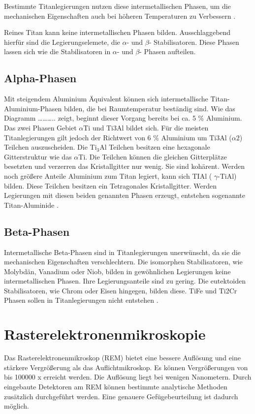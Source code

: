 \documentclass[a4paper, 11pt]{tubsreprt}
\begin{document}
Bestimmte Titanlegierungen nutzen diese intermetallischen Phasen, um die mechanischen Eigenschaften auch bei höheren Temperaturen zu Verbessern \cite{Luetjering2007}.

Reines Titan kann keine intermetallischen Phasen bilden. Ausschlaggebend hierfür sind die Legierungselemete, die $\alpha$- und $\beta$- Stabilisatoren.  Diese Phasen lassen sich wie die Stabilisatoren  in $\alpha$- und $\beta$- Phasen aufteilen.  
\subsection{Alpha-Phasen}
Mit steigendem Aluminium Äquivalent können sich intermetallische Titan-Aluminium-Phasen bilden, die bei Raumtemperatur beständig sind. Wie das Diagramm ……….. zeigt, beginnt dieser Vorgang bereits bei ca. 5 \% Aluminium. Das zwei Phasen Gebiet $\alpha$Ti und Ti3Al bildet sich. Für die meisten Titanlegierungen gilt jedoch der Richtwert von 6 \% Aluminium um Ti3Al ($\alpha2$) Teilchen auszuscheiden.  Die Ti$_{3}$Al Teilchen besitzen eine hexagonale Gitterstruktur wie das $\alpha$Ti. Die Teilchen können  die gleichen Gitterplätze besetzten und verzerren das Kristallgitter nur wenig. Sie sind kohärent.
Werden noch größere Anteile Aluminium  zum Titan legiert, kann sich TIAl ( $\gamma$-TiAl) bilden. Diese Teilchen besitzen ein Tetragonales Kristallgitter.
 Werden Legierungen mit diesen beiden genannten Phasen erzeugt, entstehen sogenannte Titan-Aluminide \cite[vgl.]{Luetjering2007}.   

\subsection{Beta-Phasen}
Intermetallische Beta-Phasen sind in Titanlegierungen unerwünscht, da sie die mechanischen Eigenschaften verschlechtern. Die isomorphen Stabilisatoren, wie Molybdän, Vanadium oder Niob, bilden in gewöhnlichen Legierungen keine intermetallischen Phasen. Ihre Legierungsanteile sind zu gering. Die eutektoiden Stabilisatoren, wie Chrom oder Eisen hingegen, bilden diese. TiFe und Ti2Cr Phasen sollen in Titanlegierungen nicht entstehen \cite{Luetjering2007}.

\section{Rasterelektronenmikroskopie}\label{Kapitel Rasterelektrodenmikroskopie}
Das Rasterelektronenmikroskop (REM) bietet eine bessere Auflösung und eine stärkere Vergrößerung als das Auflichtmikroskop. Es können Vergrößerungen von bis 100000 x erreicht werden. Die Auflösung liegt bei wenigen Nanometern. Durch eingebaute Detektoren am REM können bestimmte analytische Methoden zusätzlich durchgeführt werden. Eine genauere Gefügebeurteilung ist dadurch möglich.  
\end{document}
